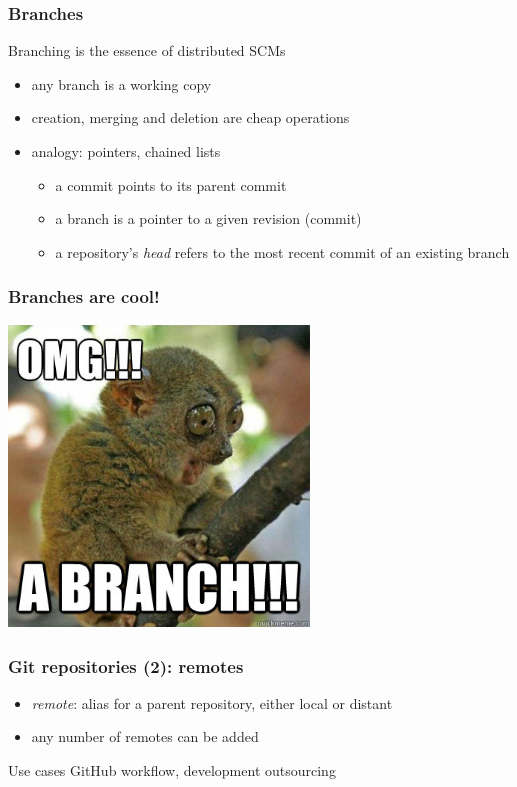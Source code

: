 \begin{frame}
  \frametitle{Branches}

  Branching is the essence of distributed SCMs
  \begin{itemize}
    \item any branch is a working copy
    \item creation, merging and deletion are cheap operations
    \item analogy: pointers, chained lists
      \begin{itemize}
        \item a commit points to its parent commit
        \item a branch is a pointer to a given revision (commit)
        \item a repository's \textit{head} refers to the most recent
          commit of an existing branch
      \end{itemize}
  \end{itemize}
\end{frame}

\begin{frame}
  \frametitle{Branches are cool!}
  \begin{center}
    \includegraphics[width=0.6\textwidth]{img/omgabranch.jpg}
  \end{center}
\end{frame}

\begin{frame}
  \frametitle{Git repositories (2): remotes}

  \begin{itemize}
    \item \textit{remote}: alias for a parent repository,
      either local or distant
    \item any number of remotes can be added
  \end{itemize}
  \begin{block}{Use cases}
    GitHub workflow, development outsourcing
  \end{block}
\end{frame}
